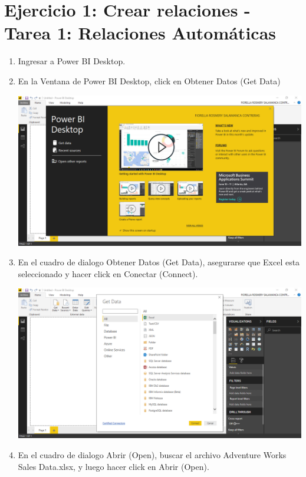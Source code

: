 \section{Ejercicio 1: Crear relaciones - Tarea 1: Relaciones Automáticas} 


\begin{enumerate}[1.]
    \item Ingresar a Power BI Desktop.
    \item En la Ventana de Power BI Desktop, click en Obtener Datos (Get Data)

	\begin{center}
	\includegraphics[width=17cm]{./Imagenes/Ejercicio1-Tarea1/1}
	\end{center}	

    \item En el cuadro de dialogo Obtener Datos (Get Data), asegurarse que Excel esta seleccionado y hacer click
en Conectar (Connect).

	\begin{center}
	\includegraphics[width=17cm]{./Imagenes/Ejercicio1-Tarea1/2}
	\end{center}	

    \item  En el cuadro de dialogo Abrir (Open), buscar el archivo Adventure Works Sales Data.xlsx, y luego hacer
click en Abrir (Open).


\end{enumerate}
